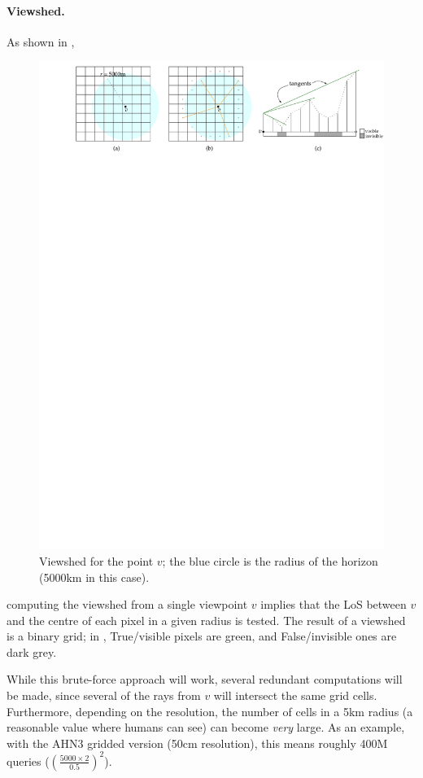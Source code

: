 \paragraph{Viewshed.}
As shown in ,
\begin{figure}
  \centering
  \includegraphics[width=\linewidth]{figs/viewshed}
  \caption{Viewshed for the point $v$; the blue circle is the radius of the horizon (5000km in this case).}%
\end{figure}
computing the viewshed from a single viewpoint $v$ implies that the LoS between $v$ and the centre of each pixel in a given radius is tested. 
The result of a viewshed is a binary grid; in , True/visible pixels are green, and False/invisible ones are dark grey.

%

While this brute-force approach will work, several redundant computations will be made, since several of the rays from $v$ will intersect the same grid cells.
Furthermore, depending on the resolution, the number of cells in a 5km radius (a reasonable value where humans can see) can become \emph{very} large.
As an example, with the AHN3 gridded version (50cm resolution), this means roughly 400M queries ($(\frac{5000 \times 2}{0.5})^2$).


